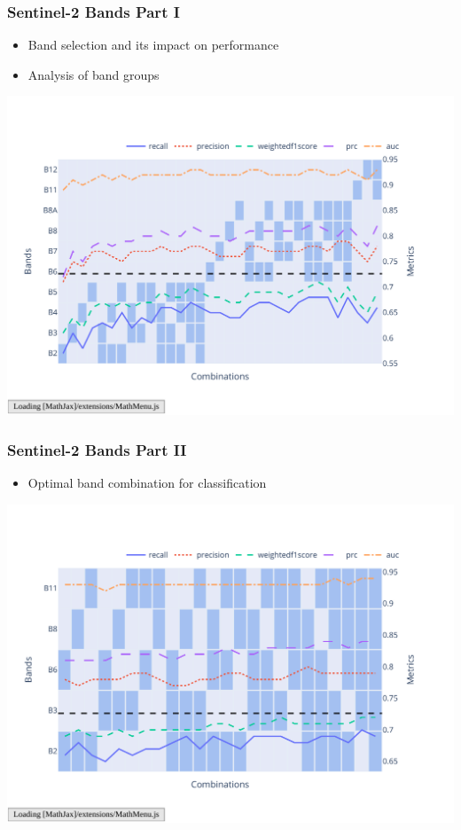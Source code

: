 \documentclass[compress]{beamer}
\begin{document}
\begin{frame}
\frametitle{Sentinel-2 Bands Part I}
\begin{itemize}
    \item Band selection and its impact on performance
    \item Analysis of band groups
\end{itemize}
\includegraphics[width=0.9\linewidth, trim={20pt 40pt 10pt 30pt}, clip]{../report/figures/figures_analysis/band_selection.pdf}
\end{frame}

\begin{frame}
    \frametitle{Sentinel-2 Bands Part II}
    \begin{itemize}
        \item Optimal band combination for classification
    \end{itemize}
    \includegraphics[width=0.9\linewidth, trim={20pt 40pt 10pt 30pt}, clip]{../report/figures/figures_analysis/band_selection_further.pdf}
    \end{frame}
\end{document}
